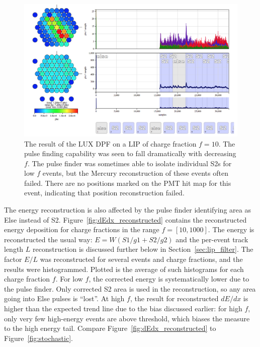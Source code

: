 \begin{figure}[htbp]
\begin{center}
\includegraphics[width=\textwidth]{figures/lips/visualux_f10_dp_2.png}
\caption{The result of the \acs{LUX} \acs{DPF} on a \acs{LIP} of charge fraction $f=10$. The pulse finding capability was seen to fall dramatically with decreasing $f$. The pulse finder was sometimes able to isolate individual S2s for low $f$ events, but the Mercury reconstruction of these events often failed. There are no positions marked on the \acs{PMT} hit map for this event, indicating that position reconstruction failed.   }
\label{fig:visualux_f10_dp_2}
\end{center}
\end{figure}

The energy reconstruction is also affected by the pulse finder identifying area as Else instead of S2. Figure~\ref{fig:dEdx_reconstructed} contains the reconstructed energy deposition for charge fractions in the range $f = [10,1000]$. The energy is reconstructed the usual way: $E = W (S1/g1 + S2/g2)$ and the per-event track length $L$ reconstruction is discussed further below in Section~\ref{sec:lip_filter}. The factor $E/L$ was reconstructed for several events and charge fractions, and the results were histogrammed. Plotted is the average of such histograms for each charge fraction $f$. For low $f$, the corrected energy is systematically lower due to the pulse finder. Only corrected S2 area is used in the reconstruction, so any area going into Else pulses is ``lost''. At high $f$, the result for reconstructed $dE/dx$ is higher than the expected trend line due to the bias discussed earlier: for high $f$, only very few high-energy events are above threshold, which biases the measure to the high energy tail. Compare Figure~\ref{fig:dEdx_reconstructed} to Figure~\ref{fig:stochastic}.

